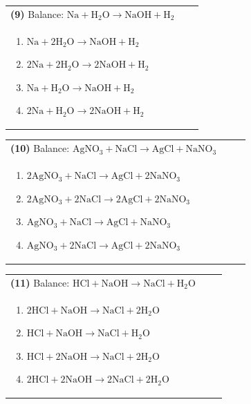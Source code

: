 \documentclass{article}
\begin{document}
{\vspace{0.2cm}
\noindent \begin{tabular}{|p{0.9\linewidth}|}
\hline
\vspace{0.2cm}
\textbf{(9)} Balance: \(\mathrm{Na + H_2O \rightarrow NaOH + H_2}\)\\
\begin{minipage}[t]{0.85\linewidth}
\begin{enumerate}[label=\alph*.]
   \item \(\mathrm{Na + 2H_2O \rightarrow NaOH + H_2}\)
   \item \(\mathrm{2Na + 2H_2O \rightarrow 2NaOH + H_2}\)
   \item \(\mathrm{Na + H_2O \rightarrow NaOH + H_2}\)
   \item \(\mathrm{2Na + H_2O \rightarrow 2NaOH + H_2}\)
\end{enumerate}
\end{minipage}\\
\hline
\end{tabular}

\vspace{0.2cm}
\noindent \begin{tabular}{|p{0.9\linewidth}|}
\hline
\vspace{0.2cm}
\textbf{(10)} Balance: \(\mathrm{AgNO_3 + NaCl \rightarrow AgCl + NaNO_3}\)\\
\begin{minipage}[t]{0.85\linewidth}
\begin{enumerate}[label=\alph*.]
   \item \(\mathrm{2AgNO_3 + NaCl \rightarrow AgCl + 2NaNO_3}\)
   \item \(\mathrm{2AgNO_3 + 2NaCl \rightarrow 2AgCl + 2NaNO_3}\)
   \item \(\mathrm{AgNO_3 + NaCl \rightarrow AgCl + NaNO_3}\)
   \item \(\mathrm{AgNO_3 + 2NaCl \rightarrow AgCl + 2NaNO_3}\)
\end{enumerate}
\end{minipage}\\
\hline
\end{tabular}

\vspace{0.2cm}
\noindent \begin{tabular}{|p{0.9\linewidth}|}
\hline
\vspace{0.2cm}
\textbf{(11)} Balance: \(\mathrm{HCl + NaOH \rightarrow NaCl + H_2O}\)\\
\begin{minipage}[t]{0.85\linewidth}
\begin{enumerate}[label=\alph*.]
   \item \(\mathrm{2HCl + NaOH \rightarrow NaCl + 2H_2O}\)
   \item \(\mathrm{HCl + NaOH \rightarrow NaCl + H_2O}\)
   \item \(\mathrm{HCl + 2NaOH \rightarrow NaCl + 2H_2O}\)
   \item \(\mathrm{2HCl + 2NaOH \rightarrow 2NaCl + 2H_2O}\)
\end{enumerate}
\end{minipage}\\
\hline
\end{tabular}

}
\end{document}
